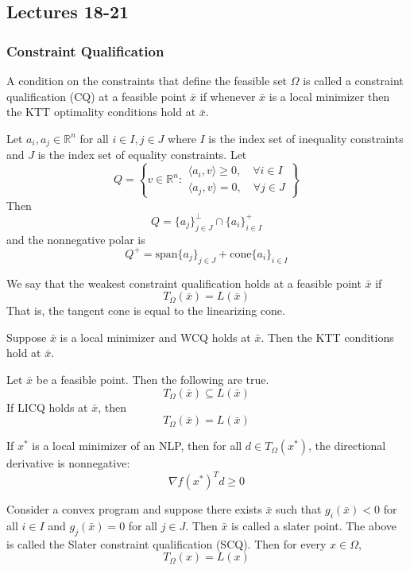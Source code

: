 \subsection{Lectures 18-21}
\subsubsection{Constraint Qualification}
\begin{definition}
    A condition on the constraints that define the feasible set $\Omega$ is called a constraint qualification (CQ) at a feasible point $\bar x$ if whenever $\bar x$ is a local minimizer then the KTT optimality conditions hold at $\bar x$.
\end{definition}
\begin{lemma}
    Let $a_i, a_j \in \mathbb R^n$ for all $i \in I, j \in J$ where $I$ is the index set of inequality constraints and $J$ is the index set of equality constraints. Let
    $$Q = \left\{v \in \mathbb R^n : \substack{\langle a_i, v \rangle \geq 0, \quad \forall i \in I \\ \langle a_j, v \rangle = 0 , \quad \forall j \in J}\right\}$$
    Then
    $$Q = \{a_j\}^\perp_{j \in J} \cap \{a_i\}^+_{i \in I}$$
    and the nonnegative polar is
    $$Q^+ = \text{span}\{a_j\}_{j \in J} + \text{cone}\{a_i\}_{i \in I}$$
\end{lemma}
\begin{definition}
    We say that the weakest constraint qualification holds at a feasible point $\bar x$ if $$T_\Omega(\bar x) = L(\bar x)$$
    That is, the tangent cone is equal to the linearizing cone.
\end{definition}
\begin{theorem}[]
    Suppose $\bar x$ is a local minimizer and WCQ holds at $\bar x$. Then the KTT conditions hold at $\bar x$.
\end{theorem}
\begin{theorem}[]
    Let $\bar x$ be a feasible point. Then the following are true.
    $$T_\Omega(\bar x) \subseteq L(\bar x)$$
    If LICQ holds at $\bar x$, then $$T_\Omega(\bar x) = L(\bar x)$$
\end{theorem}
\begin{theorem}[]
    If $x^*$ is a local minimizer of an NLP, then for all $d \in T_\Omega(x^*)$, the directional derivative is nonnegative: $$\nabla f(x^*)^Td \geq 0$$
\end{theorem}
\begin{definition}
    Consider a convex program and suppose there exists $\bar x$ such that $g_i(\bar x) < 0$ for all $i \in I$ and $g_j(\bar x) = 0$ for all $j \in J$. Then $\bar x$ is called a slater point. The above is called the Slater constraint qualification (SCQ). Then for every $x \in \Omega$, $$T_\Omega(x) = L(x)$$
\end{definition}
